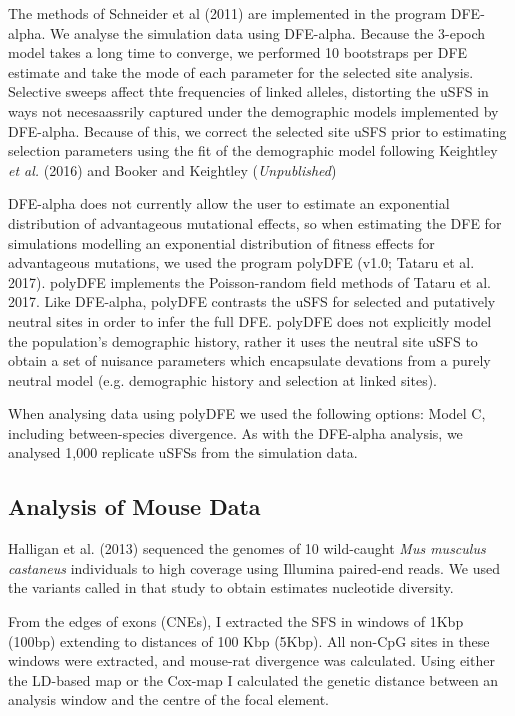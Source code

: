 \documentclass[11pt]{article}
\begin{document}
		The methods of Schneider et al (2011) are implemented in the program DFE-alpha. We analyse the simulation data using DFE-alpha. Because the 3-epoch model takes a long time to converge, we performed 10 bootstraps per DFE estimate and take the mode of each parameter for the selected site analysis. Selective sweeps affect thte frequencies of linked alleles, distorting the uSFS in ways not necesaassrily captured under the demographic models implemented by DFE-alpha. Because of this, we correct the selected site uSFS prior to estimating selection parameters using the fit of the demographic model following Keightley \textit{et al.} (2016) and Booker and Keightley (\textit{Unpublished})
			
		DFE-alpha does not currently allow the user to estimate an exponential distribution of advantageous mutational effects, so when estimating the DFE for simulations modelling an exponential distribution of fitness effects for advantageous mutations, we used the program polyDFE (v1.0; Tataru et al. 2017). polyDFE implements the Poisson-random field methods of Tataru et al. 2017. Like DFE-alpha, polyDFE contrasts the uSFS for selected and putatively neutral sites in order to infer the full DFE. polyDFE does not explicitly model the population's demographic history, rather it uses the neutral site uSFS to obtain a set of nuisance parameters which encapsulate devations from a purely neutral model (e.g. demographic history and selection at linked sites).
		
	 When analysing data using polyDFE we used the following options: Model C, including between-species divergence. As with the DFE-alpha analysis, we analysed 1,000 replicate uSFSs from the simulation data.

	\subsection*{Analysis of Mouse Data}

Halligan et al. (2013) sequenced the genomes of 10 wild-caught \emph{Mus musculus castaneus} individuals to high coverage using Illumina paired-end reads. We used the variants called in that study to obtain estimates nucleotide diversity.

	From the edges of exons (CNEs), I extracted the SFS in windows of 1Kbp (100bp) extending to distances of 100 Kbp (5Kbp). All non-CpG sites in these windows were extracted, and mouse-rat divergence was calculated. Using either the LD-based map or the Cox-map I calculated the genetic distance between an analysis window and the centre of the focal element. 
\end{document}

